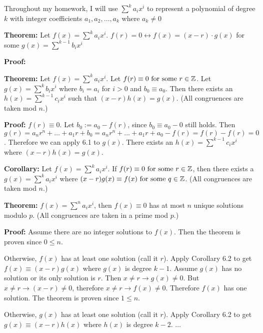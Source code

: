 Throughout my homework, I will use \(\sum^k a_i x^i\) to represent a polynomial of degree \(k\) with integer coefficients \(a_1, a_2, \dots, a_k\) where \(a_k \neq 0\)

\item \textbf{Theorem:} Let \(f(x) = \sum^k a_i x^i\). \(f(r) = 0 \leftrightarrow f(x) = (x-r) \cdot g(x)\) for some \(g(x) = \sum^{k-1} b_i x^i\)

\textbf{Proof:} %

\item \textbf{Theorem:} Let \(f(x) = \sum^k a_i x^i\). Let \(f(r) \equiv 0\textrm{\ for some\ } r \in \mathbb Z\). Let \(g(x) = \sum^k b_i x^i\) where \(b_i = a_i\) for \(i > 0\) and \(b_0 \equiv a_0\). Then there exists an \(h(x) = \sum^{k-1} c_i x^i\) such that \((x-r) h(x) = g(x)\). (All congruences are taken mod \(n\).)

\textbf{Proof:} \(f(r) \equiv 0\). Let \(b_0 := a_0 - f(r)\), since \(b_0 \equiv a_0 - 0\) still holds. Then \(g(r) = a_n r^n + \dots + a_1 r + b_0 = a_n r^n + \dots + a_1 r + a_0 - f(r) = f(r) - f(r) = 0\). Therefore we can apply 6.1 to \(g(x)\). There exists an \(h(x) = \sum^{k-1} c_i x^i\) where \((x - r) h(x) = g(x)\). \qedhere

\textbf{Corollary:} Let \(f(x) = \sum^k a_i x^i\). If \(f(r) \equiv 0 \textrm{\ for some\ } r \in \mathbb Z\), then there exists a \(g(x) = \sum^k a_i x^i\) where \((x - r) g(x) \equiv f(x) \textrm{\ for some\ } q \in \mathbb Z\). (All congruences are taken mod \(n\).)

\item \textbf{Theorem:} \(f(x) = \sum^n a_i x^i\), then \(f(x) \equiv 0\) has at most \(n\) unique solutions modulo \(p\). (All congruences are taken in a prime mod \(p\).)

\textbf{Proof:} Assume there are no integer solutions to \(f(x)\). Then the theorem is proven since \(0 \leq n\).

Otherwise, \(f(x)\) has at least one solution (call it \(r\)). Apply Corollary 6.2 to get \(f(x) \equiv (x - r) g(x)\) where \(g(x)\) is degree \(k-1\). Assume \(g(x)\) has no solution or its only solution is \(r\). Then \(x \neq r \rightarrow g(x) \neq 0\). But \(x \neq r \rightarrow (x - r) \neq 0\), therefore \(x \neq r \rightarrow f(x) \neq 0\). Therefore \(f(x)\) has one solution. The theorem is proven since \(1 \leq n\).

Otherwise, \(g(x)\) has at least one solution (call it \(r\)). Apply Corollary 6.2 to get \(g(x) \equiv (x - r) h(x)\) where \(h(x)\) is degree \(k - 2\). \(\dots\)

